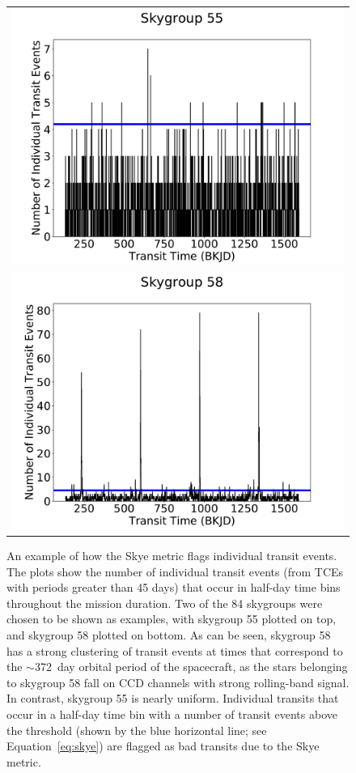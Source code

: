 \begin{figure}[h]
\centering
\begin{tabular}{c}
\includegraphics[width=\linewidth]{Skye-Paper-Plot-55.pdf}\\
\includegraphics[width=\linewidth]{Skye-Paper-Plot-58.pdf}
\end{tabular}
\caption{An example of how the Skye metric flags individual transit events. The plots show the number of individual transit events (from TCEs with periods greater than 45 days) that occur in half-day time bins throughout the mission duration. Two of the 84 skygroups were chosen to be shown as examples, with skygroup 55 plotted on top, and skygroup 58 plotted on bottom. As can be seen, skygroup 58 has a strong clustering of transit events at times that correspond to the $\sim$372~day orbital period of the spacecraft, as the stars belonging to skygroup 58 fall on CCD channels with strong rolling-band signal. In contrast, skygroup 55 is nearly uniform. Individual transits that occur in a half-day time bin with a number of transit events above the threshold (shown by the blue horizontal line; see Equation~\ref{eq:skye}) are flagged as bad transits due to the Skye metric.}
\label{skyefig}
\end{figure}


